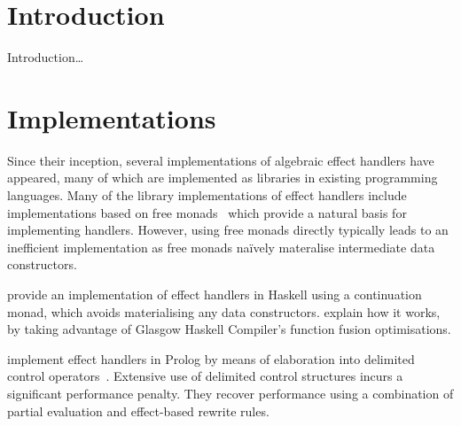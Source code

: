 \documentclass[adraft]{eptcs}
\title{\thetitle}
\author{Daniel Hillerström \institute{LFCS, University of Edinburgh, UK} \email{\reachme{daniel.hillerstrom}}}
\begin{document}
\maketitle


\begin{abstract}
An abstract will appear here\dots
\end{abstract}


\section{Introduction}
Introduction\dots

\section{Implementations}
Since their inception, several implementations of algebraic effect
handlers have appeared, many of which are implemented as libraries in
existing programming languages.
%
%
Many of the library implementations of effect handlers include
implementations based on free monads~\cite{KammarLO13, KiselyovSS13,
  KiselyovI15, Brady13, WuSH14} which provide a natural basis for
implementing handlers. However, using free monads directly typically
leads to an inefficient implementation as free monads naïvely
materalise intermediate data constructors.

\citet{KammarLO13} provide an implementation of effect handlers in
Haskell using a continuation monad, which avoids materialising any
data constructors. \citet{WuS15} explain how it works, by taking
advantage of Glasgow Haskell Compiler's function fusion
optimisations.

\citet{SalehS16} implement effect handlers in Prolog by means of
elaboration into delimited control
operators~\cite{SchrijversDDW13}. Extensive use of delimited control
structures incurs a significant performance penalty. They recover
performance using a combination of partial evaluation and effect-based
rewrite rules.
\end{document}
